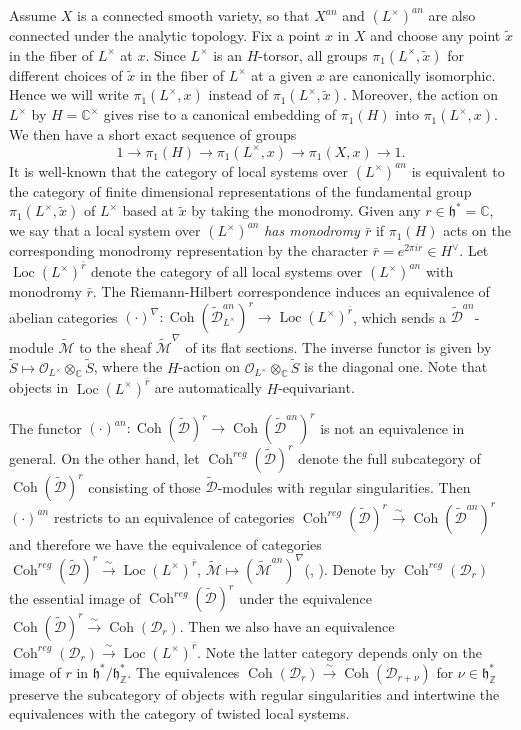 \documentclass[12pt]{amsart}
\newcommand{\C}{\mathbb{C}}
\newcommand{\M}{\mathcal{M}}
\newcommand{\Z}{\mathbb{Z}}
\newcommand{\hf}{\mathfrak{h}}
\newcommand{\cm}{\C^\times}
\newcommand{\OO}{\mathcal{O}}
\newcommand{\wt}{\widetilde}
\newcommand{\loc}{\operatorname{Loc}}
\newcommand{\coh}{\operatorname{Coh}}
\theoremstyle{definition}
\numberwithin{equation}{section}
\begin{document}
Assume $X$ is a connected smooth variety, so that $X^{an}$ and $(L^\times)^{an}$ are also connected under the analytic topology. Fix a point $x$ in $X$ and choose any point $\tilde{x}$ in the fiber of $L^\times$ at $x$. Since $L^\times$ is an $H$-torsor, all groups $\pi_1(L^\times, \tilde{x})$ for different choices of $\tilde{x}$ in the fiber of $L^\times$ at a given $x$ are canonically isomorphic. Hence we will write $\pi_1(L^\times, x)$  instead of $\pi_1(L^\times, \tilde{x})$. Moreover, the action on $L^\times$ by $H = \cm$ gives rise to a canonical embedding of $\pi_1(H)$ into $\pi_1(L^\times, x)$. We then have a short exact sequence of groups
\begin{equation}\label{eq:pi_exsq}
	1 \to \pi_1(H) \to \pi_1(L^\times, x) \to \pi_1(X, x) \to 1.
\end{equation}
It is well-known that the category of local systems over $(L^\times)^{an}$ is equivalent to the category of finite dimensional representations of the fundamental group $\pi_1(L^\times, \tilde{x})$ of $L^\times$ based at $\tilde{x}$ by taking the monodromy. Given any $r \in \hf^*=\C$, we say that a local system over $(L^\times)^{an}$ \emph{has monodromy $\bar{r}$} if  $\pi_1(H)$ acts on the corresponding monodromy representation by the character $\bar{r} = e^{2\pi i r} \in H^\vee$. Let $\loc(L^\times)^{\bar{r}}$ denote the category of all local systems over $(L^\times)^{an}$ with monodromy $\bar{r}$.  The Riemann-Hilbert correspondence induces an equivalence of abelian categories $( \cdot )^\nabla : \coh(\wt{\mathscr{D}}^{an}_{L^\times})^r \to \loc(L^\times)^{\bar{r}}$, which sends a $\wt{\mathscr{D}}^{an}$-module $\wt{\M}$ to the sheaf $\wt{\M}^\nabla$ of its flat sections. The inverse functor is given by $\wt{S} \mapsto \OO_{L^\times} \otimes_{\C} \wt{S}$, where the $H$-action on $\OO_{L^\times} \otimes_{\C} \wt{S}$ is the diagonal one. Note that objects in $\loc(L^\times)^{\bar{r}}$ are automatically $H$-equivariant. 

The functor $(\cdot)^{an}:  \coh(\wt{\mathscr{D}})^{r}  \to \coh(\wt{\mathscr{D}}^{an})^{r}$ is not an equivalence in general. On the other hand, let $\coh^{reg}(\wt{\mathscr{D}})^{r}$ denote the full subcategory of $\coh(\wt{\mathscr{D}})^{r}$ consisting of those $\wt{\mathscr{D}}$-modules with regular singularities. Then $(\cdot)^{an}$ restricts to an equivalence of categories $\coh^{reg}(\wt{\mathscr{D}})^{r} \xrightarrow{\sim} \coh(\wt{\mathscr{D}}^{an})^{r}$ and therefore we have the equivalence of categories $\coh^{reg}(\wt{\mathscr{D}})^{r} \xrightarrow{\sim}  \loc(L^\times)^{\bar{r}}$, $\wt{\M} \mapsto (\wt{\M}^{an})^{\nabla}$(\cite{Deligne}, \cite[Remark 2.5.5, (iii)]{BB}). Denote by $\coh^{reg}(\mathscr{D}_r)$ the essential image of $\coh^{reg}(\wt{\mathscr{D}})^{r}$ under the equivalence $\coh(\wt{\mathscr{D}})^{r} \xrightarrow{\sim} \coh(\mathscr{D}_r)$. Then we also have an equivalence  $\coh^{reg}(\mathscr{D}_r) \xrightarrow{\sim} \loc(L^\times)^{\bar{r}}$. Note the latter category depends only on the image of $r$ in $\hf^*/\hf^*_\Z$. The equivalences $\coh(\mathscr{D}_r) \xrightarrow{\sim} \coh(\mathscr{D}_{r + \nu})$ for $\nu \in \hf^*_\Z$ preserve the subcategory of objects with regular singularities and intertwine the equivalences with the category of twisted local systems.
\end{document}

